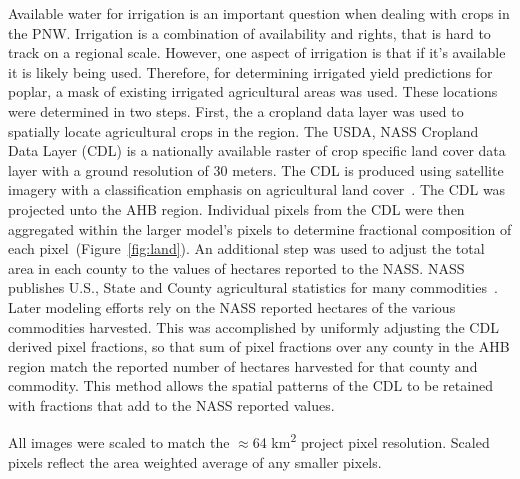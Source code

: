 \documentclass[preprint,review,12pt]{elsarticle}
\begin{document}


Available water for irrigation is an important question when dealing
with crops in the \ac{PNW}.  Irrigation is a combination of
availability and rights, that is hard to track on a regional scale.
However, one aspect of irrigation is that if it's available it is
likely being used.  Therefore, for determining irrigated yield
predictions for poplar, a mask of existing irrigated agricultural
areas was used.  These locations were determined in two steps.  First,
the a cropland data layer was used to spatially locate agricultural
crops in the region.  The USDA, NASS Cropland Data Layer (CDL) is a
nationally available raster of crop specific land cover data layer
with a ground resolution of 30 meters.  The CDL is produced using
satellite imagery with a classification emphasis on agricultural land
cover~\cite{Boryan2011a}.  The CDL was projected unto the \ac{AHB}
region.  Individual pixels from the CDL were then aggregated within
the larger model's pixels to determine fractional composition of each
pixel~(Figure~\ref{fig:land}).  An additional step was used to adjust
the total area in each county to the values of hectares reported to
the \ac{NASS}.  \ac{NASS} publishes U.S., State and County
agricultural statistics for many commodities~\cite{Service2015}.
Later modeling efforts rely on the \ac{NASS} reported hectares of the
various commodities harvested.  This was accomplished by uniformly
adjusting the CDL derived pixel fractions, so that sum of pixel
fractions over any county in the \ac{AHB} region match the reported
number of hectares harvested for that county and commodity.  This
method allows the spatial patterns of the CDL to be retained with
fractions that add to the \ac{NASS} reported values.

All images were scaled to match the $\approx$64 km\textsuperscript{2}
project pixel resolution. Scaled pixels reflect the area weighted
average of any smaller pixels.
\end{document}
